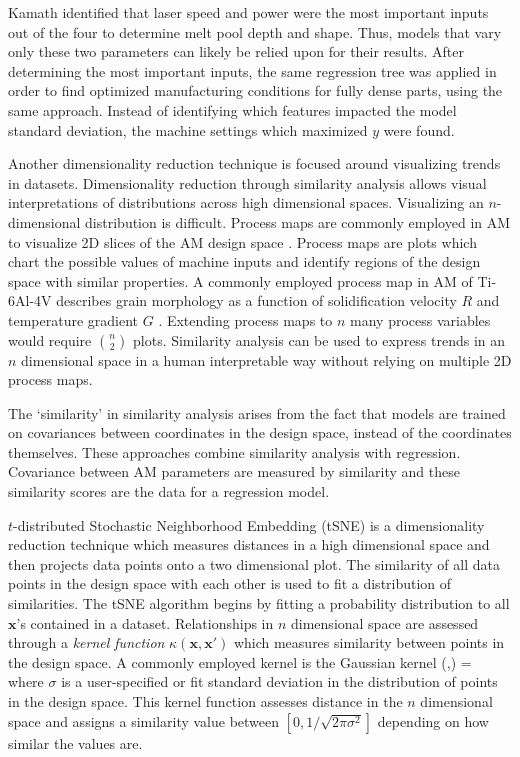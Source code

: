 Kamath identified that laser speed and power were the most important inputs out of the four to determine melt pool depth and shape. Thus, models that vary only these two parameters can likely be relied upon for their results.  After determining the most important inputs, the same regression tree was applied in order to find optimized manufacturing conditions for fully dense parts, using the same approach. Instead of identifying which features impacted the model standard deviation, the machine settings which maximized $y$ were found. 

Another dimensionality reduction technique is focused around visualizing trends in datasets. Dimensionality reduction through similarity analysis allows visual interpretations of distributions across high dimensional spaces. Visualizing an $n$-dimensional distribution is difficult. Process maps are commonly employed in AM to visualize 2D slices of the AM design space \cite{Beuth2001}. Process maps are plots which chart the possible values of machine inputs and identify regions of the design space with similar properties. A commonly employed process map in AM of Ti-6Al-4V describes grain morphology as a function of solidification velocity $R$ and temperature gradient $G$ \cite{DeHoff2015}. Extending process maps to $n$ many process variables would require ${n \choose 2}$ plots. Similarity analysis can be used to express trends in an $n$ dimensional space in a human interpretable way without relying on multiple 2D process maps. 

The `similarity' in similarity analysis arises from the fact that models are trained on covariances between coordinates in the design space, instead of the coordinates themselves. These approaches combine similarity analysis with regression. Covariance between AM parameters are measured by similarity and these similarity scores are the data for a regression model. 

$t$-distributed Stochastic Neighborhood Embedding (tSNE) is a dimensionality reduction technique which measures distances in a high dimensional space and then projects data points onto a two dimensional plot. The similarity of all data points in the design space with each other is used to fit a distribution of similarities. The tSNE algorithm begins by fitting a probability distribution to all $\mathbf{x}$'s contained in a dataset. Relationships in $n$ dimensional space are assessed through a \textit{kernel function} $\kappa(\mathbf{x},\mathbf{x'})$ which measures similarity between points in the design space. A commonly employed kernel is the Gaussian kernel
\eqn
	\kappa(,) = 
	\label{gausskernel}
\equ 
where $\sigma$ is a user-specified or fit standard deviation in the distribution of points in the design space. This kernel function assesses distance in the $n$ dimensional space and assigns a similarity value between $\left[0, 1/\sqrt{2\pi\sigma^2}\right]$ depending on how similar the values are. 

